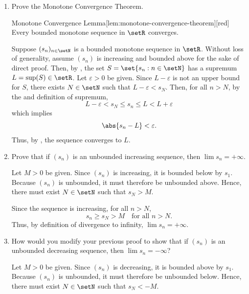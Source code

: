 \begin{enumerate}
  \item Prove the Monotone Convergence Theorem.
  \begin{define}{Monotone Convergence Lemma}[lem:monotone-convergence-theorem][red]
    Every bounded monotone sequence in \(\setR\) converges.
  \end{define}
  \begin{subprove}
    Suppose \((s_n)_{n\in\setN}\) is a bounded monotone sequence in \(\setR\).
    Without loss of generality, assume \((s_n)\) is increasing and bounded above for the sake of direct proof.
    Then, by , the set \(S = \set{s_n : n \in \setN}\) has a supremum \(L = \sup(S) \in \setR\).
    Let \(\varepsilon > 0\) be given.
    Since \(L - \varepsilon\) is not an upper bound for \(S\),
    there exists \(N \in \setN\) such that \(L - \varepsilon < s_N\).
    Then, for all \(n > N\), by the  and definition of supremum,
    \[
      L - \varepsilon < s_N \leq s_n \leq L < L + \varepsilon
    \]
    which implies
    \[
      \abs{s_n - L} < \varepsilon.
    \]
    Thus, by , the sequence converges to \(L\).
  \end{subprove}
  
  \item Prove that if \((s_n)\) is an unbounded increasing sequence, 
  then \(\lim s_n = +\infty\).
  \begin{subprove}
    Let \(M > 0\) be given.
    Since \((s_n)\) is increasing, it is bounded below by \(s_1\).
    Because \((s_n)\) is unbounded, it must therefore be unbounded above.
    Hence, there must exist \(N \in \setN\) 
    such that \(s_N > M\).
    
    Since the sequence is increasing, for all \(n > N\), 
    \[
      s_n \ge s_N > M \quad\text{for all } n > N.
    \]
    Thus, by definition of divergence to infinity, \(\lim s_n = +\infty\).
  \end{subprove}
  \newpage
  \item How would you modify your previous proof to show that if \((s_n)\) is an unbounded decreasing sequence, then \(\lim s_n = -\infty\)?
  \begin{subprove}
    Let \(M > 0\) be given.
    Since \((s_n)\) is decreasing, it is bounded above by \(s_1\).
    Because \((s_n)\) is unbounded, it must therefore be unbounded below.
    Hence, there must exist \(N \in \setN\) 
    such that \(s_N < -M\).
    

\end{subprove}
\end{enumerate}
